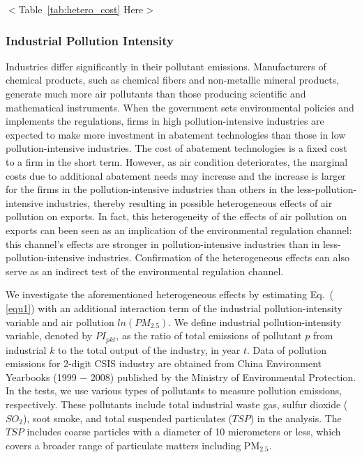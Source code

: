 \documentclass[12pt]{article}
\begin{document}
\begin{center}
$<$Table~\ref{tab:hetero_cost} Here$>$
\end{center}

  \subsubsection{Industrial Pollution Intensity}
  \label{sec:5.2.1} 
  Industries differ significantly in their pollutant
  emissions. Manufacturers of chemical products, such as chemical fibers and
  non-metallic mineral products, generate much more air pollutants than those
  producing scientific and mathematical instruments. When the government sets
  environmental policies and implements the regulations, firms in high
  pollution-intensive industries are expected to make more investment in
  abatement technologies than those in low pollution-intensive industries. The
  cost of abatement technologies is a fixed cost to a firm in the short term.
  However, as air condition deteriorates, the marginal costs due to additional
  abatement needs may increase and the increase is larger for the firms in the
  pollution-intensive industries than others in the less-pollution-intensive
  industries, thereby resulting in possible heterogeneous effects of air
  pollution on exports. In fact, this heterogeneity of the effects of air
pollution on exports can been seen as an implication of the environmental
regulation channel: this channel's effects are stronger in
pollution-intensive industries than in less-pollution-intensive industries.
Confirmation of the heterogeneous effects can also serve as an indirect test
of the environmental regulation channel.
  
  We investigate the aforementioned heterogeneous effects by estimating Eq.~(%
\ref{equ1}) with an additional interaction term of the industrial
pollution-intensity variable and air pollution $ln(PM_{2.5})$. We define industrial pollution-intensity
  variable, denoted by $PI_{pkt}$, as the ratio of total emissions of
  pollutant $p$ from industrial $k$ to the total output of the industry, in year $t$. Data of pollution emissions for 2-digit CSIS industry are obtained 
  from China Environment Yearbooks (1999 $-$ 2008) published by the Ministry of Environmental Protection. In the tests, we use various types of pollutants to measure pollution emissions, respectively. These pollutants include total industrial waste gas, sulfur dioxide ($SO_{2}$), soot smoke, and total suspended particulates ($TSP$) in the analysis. The
  $TSP$ includes coarse particles with a diameter of 10 micrometers
  or less, which covers a broader range of particulate matters including $\mathrm{PM_{2.5}}$.
  
\end{document}
